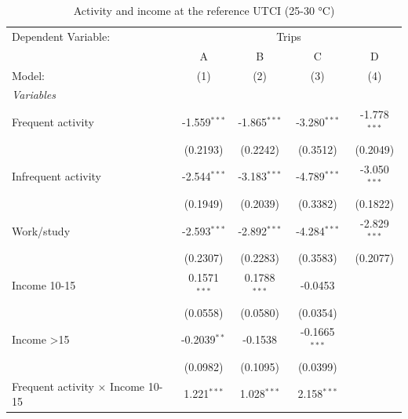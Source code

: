 
\begin{table}[htbp]
   \caption{\label{table_models_abcd_reference} Activity and income at the reference UTCI (25-30 °C)}
   \centering
   \scriptsize
   \begin{tabular}{lcccc}
      \tabularnewline \midrule \midrule
      Dependent Variable: & \multicolumn{4}{c}{Trips}\\
                                                   & A                     & B                    & C                    & D \\   
      Model:                                       & (1)                   & (2)                  & (3)                  & (4)\\  
      \midrule
      \emph{Variables}\\
      Frequent activity                            & -1.559$^{***}$        & -1.865$^{***}$       & -3.280$^{***}$       & -1.778$^{***}$\\   
                                                   & (0.2193)              & (0.2242)             & (0.3512)             & (0.2049)\\   
      Infrequent activity                          & -2.544$^{***}$        & -3.183$^{***}$       & -4.789$^{***}$       & -3.050$^{***}$\\   
                                                   & (0.1949)              & (0.2039)             & (0.3382)             & (0.1822)\\   
      Work/study                                   & -2.593$^{***}$        & -2.892$^{***}$       & -4.284$^{***}$       & -2.829$^{***}$\\   
                                                   & (0.2307)              & (0.2283)             & (0.3583)             & (0.2077)\\   
      Income 10-15                                 & 0.1571$^{***}$        & 0.1788$^{***}$       & -0.0453              &   \\   
                                                   & (0.0558)              & (0.0580)             & (0.0354)             &   \\   
      Income >15                                   & -0.2039$^{**}$        & -0.1538              & -0.1665$^{***}$      &   \\   
                                                   & (0.0982)              & (0.1095)             & (0.0399)             &   \\   
      Frequent activity $\times$ Income 10-15      & 1.221$^{***}$         & 1.028$^{***}$        & 2.158$^{***}$        &   \\   

\end{tabular}
\end{table}
